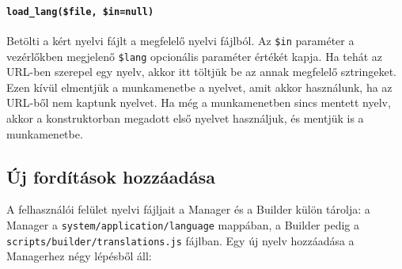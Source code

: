 \documentclass[12pt,a4paper,twoside]{article}
\begin{document}
\paragraph{\texttt{load\_lang(\$file, \$in=null)}}
Betölti a kért nyelvi fájlt a megfelelő nyelvi fájlból. Az \texttt{\$in}
paraméter a vezérlőkben megjelenő \texttt{\$lang} opcionális paraméter értékét
kapja. Ha tehát az URL-ben szerepel egy nyelv, akkor itt töltjük be az annak
megfelelő sztringeket. Ezen kívül elmentjük a munkamenetbe a nyelvet, amit akkor
használunk, ha az URL-ből nem kaptunk nyelvet. Ha még a munkamenetben sincs
mentett nyelv, akkor a konstruktorban megadott első nyelvet használjuk, és
mentjük is a munkamenetbe.


\subsection{Új fordítások hozzáadása}
\label{sec:manager-i18n}

A felhasználói felület nyelvi fájljait a Manager és a Builder külön tárolja: a
Manager a \texttt{system/application/language} mappában, a Builder pedig a
\texttt{scripts/builder/translations.js} fájlban. Egy új nyelv hozzáadása a
Managerhez négy lépésből áll:
\end{document}
